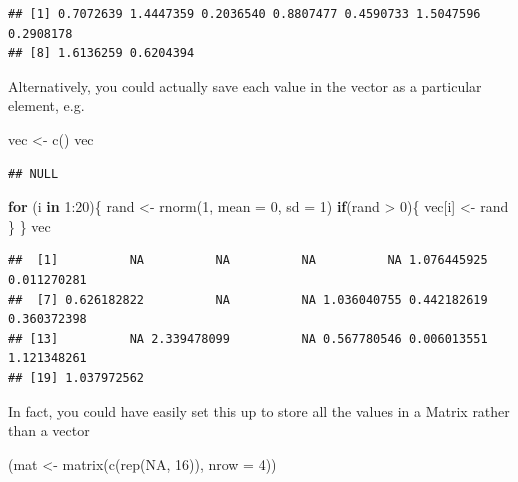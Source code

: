 \documentclass[
]{book}
\newenvironment{Shaded}{\begin{snugshade}}{\end{snugshade}}
\newcommand{\AttributeTok}[1]{\textcolor[rgb]{0.77,0.63,0.00}{#1}}
\newcommand{\ConstantTok}[1]{\textcolor[rgb]{0.00,0.00,0.00}{#1}}
\newcommand{\ControlFlowTok}[1]{\textcolor[rgb]{0.13,0.29,0.53}{\textbf{#1}}}
\newcommand{\DecValTok}[1]{\textcolor[rgb]{0.00,0.00,0.81}{#1}}
\newcommand{\FunctionTok}[1]{\textcolor[rgb]{0.00,0.00,0.00}{#1}}
\newcommand{\NormalTok}[1]{#1}
\newcommand{\OtherTok}[1]{\textcolor[rgb]{0.56,0.35,0.01}{#1}}
\newcommand{\SpecialCharTok}[1]{\textcolor[rgb]{0.00,0.00,0.00}{#1}}
\theoremstyle{definition}
\theoremstyle{definition}
\theoremstyle{definition}
\theoremstyle{definition}
\theoremstyle{remark}
\begin{document}
\begin{verbatim}
## [1] 0.7072639 1.4447359 0.2036540 0.8807477 0.4590733 1.5047596 0.2908178
## [8] 1.6136259 0.6204394
\end{verbatim}

Alternatively, you could actually save each value in the vector as a particular element, e.g.

\begin{Shaded}
\begin{Highlighting}[]
\NormalTok{vec }\OtherTok{\textless{}{-}} \FunctionTok{c}\NormalTok{()}
\NormalTok{vec}
\end{Highlighting}
\end{Shaded}

\begin{verbatim}
## NULL
\end{verbatim}

\begin{Shaded}
\begin{Highlighting}[]
\ControlFlowTok{for}\NormalTok{ (i }\ControlFlowTok{in} \DecValTok{1}\SpecialCharTok{:}\DecValTok{20}\NormalTok{)\{}
\NormalTok{  rand }\OtherTok{\textless{}{-}} \FunctionTok{rnorm}\NormalTok{(}\DecValTok{1}\NormalTok{, }\AttributeTok{mean =} \DecValTok{0}\NormalTok{, }\AttributeTok{sd =} \DecValTok{1}\NormalTok{)}
  \ControlFlowTok{if}\NormalTok{(rand }\SpecialCharTok{\textgreater{}} \DecValTok{0}\NormalTok{)\{}
\NormalTok{    vec[i] }\OtherTok{\textless{}{-}}\NormalTok{ rand}
\NormalTok{  \}}
\NormalTok{\}}
\NormalTok{vec}
\end{Highlighting}
\end{Shaded}

\begin{verbatim}
##  [1]          NA          NA          NA          NA 1.076445925 0.011270281
##  [7] 0.626182822          NA          NA 1.036040755 0.442182619 0.360372398
## [13]          NA 2.339478099          NA 0.567780546 0.006013551 1.121348261
## [19] 1.037972562
\end{verbatim}

In fact, you could have easily set this up to store all the values in a Matrix rather than a vector

\begin{Shaded}
\begin{Highlighting}[]
\NormalTok{(mat }\OtherTok{\textless{}{-}} \FunctionTok{matrix}\NormalTok{(}\FunctionTok{c}\NormalTok{(}\FunctionTok{rep}\NormalTok{(}\ConstantTok{NA}\NormalTok{, }\DecValTok{16}\NormalTok{)), }\AttributeTok{nrow =} \DecValTok{4}\NormalTok{))}
\end{Highlighting}
\end{Shaded}
\end{document}
